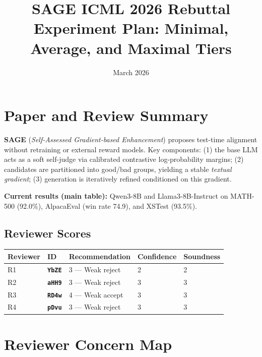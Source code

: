 \documentclass[11pt,a4paper]{article}
\title{\textbf{SAGE ICML 2026 Rebuttal}\\[0.4em]
\large Experiment Plan: Minimal, Average, and Maximal Tiers}
\author{}
\date{March 2026}
\newcommand{\rev}[1]{\texttt{\textbf{#1}}}
\begin{document}
\maketitle
\tableofcontents
\newpage

\section{Paper and Review Summary}

\textbf{SAGE} (\textit{Self-Assessed Gradient-based Enhancement}) proposes test-time alignment
without retraining or external reward models. Key components: (1) the base LLM acts as a
soft self-judge via calibrated contrastive log-probability margins; (2) candidates are partitioned
into good/bad groups, yielding a stable \textit{textual gradient}; (3) generation is iteratively
refined conditioned on this gradient.

\textbf{Current results (main table):} Qwen3-8B and Llama3-8B-Instruct on MATH-500 (92.0\%),
AlpacaEval (win rate 74.9), and XSTest (93.5\%).

\subsection{Reviewer Scores}

\begin{center}
\begin{tabular}{lllll}
\toprule
\textbf{Reviewer} & \textbf{ID} & \textbf{Recommendation} & \textbf{Confidence} & \textbf{Soundness} \\
\midrule
R1 & \rev{YbZE} & 3 --- Weak reject & 2 & 2 \\
R2 & \rev{aHH9} & 3 --- Weak reject & 3 & 3 \\
R3 & \rev{RD4w} & 4 --- Weak accept & 3 & 3 \\
R4 & \rev{pDvu} & 3 --- Weak reject & 3 & 3 \\
\bottomrule
\end{tabular}
\end{center}

\section{Reviewer Concern Map}
\end{document}

